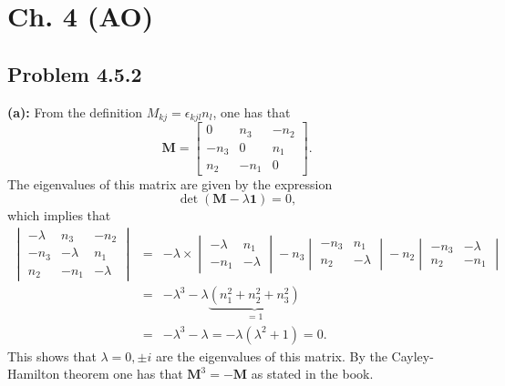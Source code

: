 \section{Ch. 4 (AO)}
\subsection{Problem 4.5.2}

\textbf{(a):} From the definition $M_{kj} = \epsilon_{kjl} n_l$, one has that
\begin{equation}
\textbf{M}= \begin{bmatrix}
0 & n_3 & -n_2\\
-n_3 & 0 & n_1 \\
n_2 & -n_1 & 0 
\end{bmatrix}.
\end{equation}
The eigenvalues of this matrix are given by the expression
\begin{equation}
\det(\textbf{M}-\lambda \textbf{1})= 0,
\end{equation}
which implies that
\begin{eqnarray} \begin{vmatrix}
-\lambda & n_3 & -n_2\\
-n_3 & -\lambda & n_1 \\
n_2 & -n_1 & -\lambda 
\end{vmatrix} &=& -\lambda \times \begin{vmatrix}
-\lambda & n_1 \\
-n_1 & -\lambda \end{vmatrix} - n_3 \begin{vmatrix}
-n_3 & n_1 \\
n_2 & -\lambda 
\end{vmatrix} - n_2 \begin{vmatrix}
-n_3 & -\lambda \\
n_2 & -n_1 
\end{vmatrix} \\
&=& -\lambda^3 -\lambda\underbrace{(n_1^2 + n_2 ^ 2 + n_3^2)}_{=1} \\&=&  -\lambda^3 - \lambda = -\lambda(\lambda^2+1) =  0.
\end{eqnarray}
This shows that $\lambda = 0, \pm i$ are the eigenvalues of this matrix. By the Cayley-Hamilton theorem one has that $\textbf{M}^3=-\textbf{M}$ as stated in the book.

